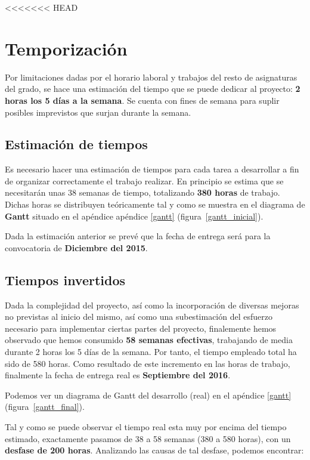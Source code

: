 \begin{itemize}
\begin{itemize}
\begin{itemize}
<<<<<<< HEAD
\section{Temporización}

Por limitaciones dadas por el horario laboral y trabajos del resto de asignaturas del grado, se hace una estimación del tiempo que se puede dedicar al proyecto: \textbf{2 horas los 5 días a la semana}. Se cuenta con fines de semana para suplir posibles imprevistos que surjan durante la semana. 


\subsection{Estimación de tiempos}

Es necesario hacer una estimación de tiempos para cada tarea a desarrollar a fin de organizar correctamente el trabajo  realizar. En principio se estima que se necesitarán unas 38 semanas de tiempo, totalizando \textbf{380 horas} de trabajo. Dichas horas se distribuyen teóricamente tal y como se muestra en el diagrama de \textbf{Gantt} situado en el apéndice apéndice \ref{gantt} (figura~\ref{gantt_inicial}).

Dada la estimación anterior se prevé que la fecha de entrega será para la convocatoria de \textbf{Diciembre del 2015}.


\subsection{Tiempos invertidos}

Dada la complejidad del proyecto, así como la incorporación de diversas mejoras no previstas al inicio del mismo, así como una subestimación del esfuerzo necesario para implementar ciertas partes del proyecto, finalemente hemos observado que hemos consumido \textbf{58 semanas efectivas}, trabajando de media durante 2 horas los 5 días de la semana. Por tanto, el tiempo empleado total ha sido de 580 horas. Como resultado de este incremento en las horas de trabajo, finalmente la fecha de entrega real es \textbf{Septiembre del 2016}.

Podemos ver un diagrama de Gantt del desarrollo (real) en el apéndice \ref{gantt} (figura~\ref{gantt_final}).


Tal y como se puede observar el tiempo real esta muy por encima del tiempo estimado, exactamente pasamos de 38 a 58 semanas (380 a 580 horas), con un \textbf{desfase de 200 horas}. Analizando las causas de tal desfase, podemos encontrar:


\end{itemize}
\end{itemize}
\end{itemize}
